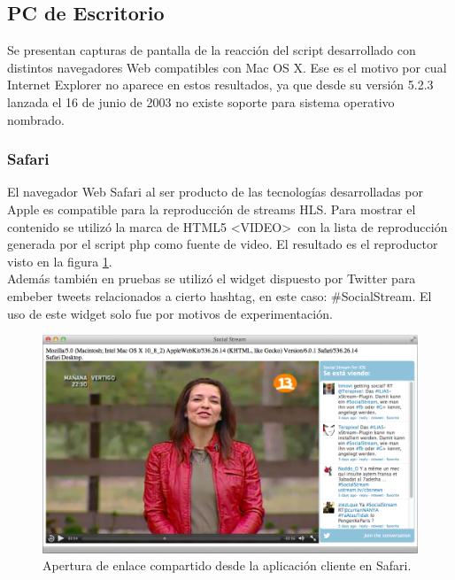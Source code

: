   \subsection{PC de Escritorio}
  Se presentan capturas de pantalla de la reacción del script desarrollado con distintos navegadores Web compatibles con Mac OS X. Ese es el motivo por cual Internet Explorer no aparece en estos resultados, ya que desde su versión 5.2.3 lanzada el 16 de junio de 2003 \cite{bib:mac-iexplorer} no existe soporte para sistema operativo nombrado.

    \subsubsection{Safari}
El navegador Web Safari al ser producto de las tecnologías desarrolladas por Apple es compatible para la reproducción de streams HLS. Para mostrar el contenido se utilizó la marca de HTML5  \textless VIDEO\textgreater \ con la lista de reproducción generada por el script php como fuente de video. El resultado es el reproductor visto en la figura \ref{fig:uagent-safari}.\\

Además también en pruebas se utilizó el widget dispuesto por Twitter \cite{bib:twitter-widget} para embeber tweets relacionados a cierto hashtag, en este caso: \#SocialStream. El uso de este widget solo fue por motivos de experimentación.

  \begin{figure}[H]
	\centering
	\includegraphics[scale=0.4]{imgs/uagent-safari.png} 
	\caption{Apertura de enlace compartido desde la aplicación cliente en Safari.}
	\label{fig:uagent-safari}
\end{figure}  
    
